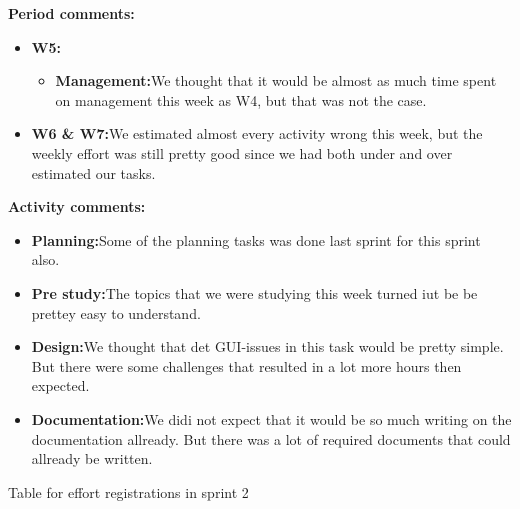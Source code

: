 \begin{table}
\textbf{Period comments:}
\begin{itemize}
\item{}\textbf{W5:}
\begin{itemize}
\item{}\textbf{Management:}We thought that it would be almost as much time spent on management this week as W4, but that was not the case.
\end{itemize}
\item{}\textbf{W6 \& W7:}We estimated almost every activity wrong this week, but the weekly effort was still pretty good since we had both under and over estimated our tasks.
\end{itemize}

\textbf{Activity comments:}
\begin{itemize}
\item{}\textbf{Planning:}Some of the planning tasks was done last sprint for this sprint also.
\item{}\textbf{Pre study:}The topics that we were studying this week turned iut be be prettey easy to understand.
\item{}\textbf{Design:}We thought that det GUI-issues in this task would be pretty simple. But there were some challenges that resulted in a lot more hours then expected.
\item{}\textbf{Documentation:}We didi not expect that it would be so much writing on the documentation allready. But there was a lot of required documents that could allready be written.
\end{itemize}
\caption{Table for effort registrations in sprint 2} \label{tab:effortweekss2}
\end{table}